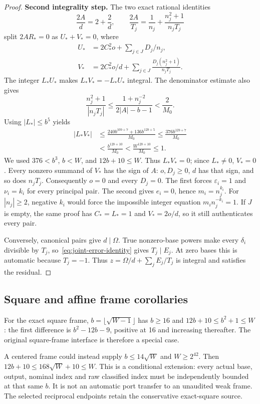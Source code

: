 \begin{proof}
\textbf{Second integrality step.}
The two exact rational identities
\[
 \frac{2A}{d}=2+\frac2d,
 \qquad\frac{2A}{T_j}=\frac1{n_j}+
             \frac{n_j^2+1}{n_jT_j}
\]
split $2AR_*=0$ as $U_*+V_*=0$, where
\begin{align*}
 U_*&=2C_*^2o+\sum_{j\in J}D_j/n_j,\\
 V_*&=2C_*^2o/d+
       \sum_{j\in J}\frac{D_j(n_j^2+1)}{n_jT_j}.
\end{align*}
The integer $L_*U_*$ makes $L_*V_*=-L_*U_*$ integral. The denominator
estimate also gives
\[
 \frac{n_j^2+1}{|n_jT_j|}
 \le\frac{1+n_j^{-2}}{2|A|-b-1}<\frac2{M_0}.
\]
Using $|L_*|\le b^5$ yields
\begin{align*}
 |L_*V_*|
 &\le\frac{240b^{10b+7}+136b^{12b+5}}{M_0}
 \le\frac{376b^{12b+7}}{M_0}\\
 &<\frac{b^{12b+10}}{M_0}
 <\frac{W^{12b+10}}{M_0}\le1.
\end{align*}
We used $376<b^3$, $b<W$, and $12b+10\le W$.
Thus $L_*V_*=0$; since $L_*\ne0$, $V_*=0$.
Every nonzero summand of $V_*$ has the sign of $A$: $o,D_j\ge0$,
$d$ has that sign, and so does $n_jT_j$. Consequently $o=0$ and every
$D_j=0$. The first forces $\varepsilon_i=1$ and $\nu_i=k_i$ for every
principal pair. The second gives $e_i=0$, hence $m_i=n_j^{k_i}$.
For $|n_j|\ge2$, negative $k_i$ would force the impossible integer equation
$m_in_j^{-k_i}=1$. If $J$ is empty, the same proof has $C_*=L_*=1$
and $V_*=2o/d$, so it still authenticates every pair.

Conversely, canonical pairs give $d\mid\Omega$. True nonzero-base powers
make every $\delta_i$ divisible by $T_j$, so~\eqref{eq:joint-error-identity}
gives $T_j\mid E_j$. At zero bases this is automatic because $T_j=-1$.
Thus $z=\Omega/d+\sum_jE_j/T_j$ is integral and satisfies the residual.
\end{proof}

\subsection{Square and affine frame corollaries}
For the exact square frame, $b=\lfloor\sqrt{W-1}\rfloor$ has
$b\ge16$ and $12b+10\le b^2+1\le W$: the first difference is
$b^2-12b-9$, positive at 16 and increasing thereafter. The original
square-frame interface is therefore a special case.

A centered frame could instead supply $b\le14\sqrt W$ and
$W\ge2^{42}$. Then $12b+10\le168\sqrt W+10\le W$.
This is a conditional extension: every actual base, output, nominal index
and raw classified index must be independently bounded at that same $b$.
It is not an automatic port transfer to an unaudited weak frame. The selected
reciprocal endpoints retain the conservative exact-square source.

